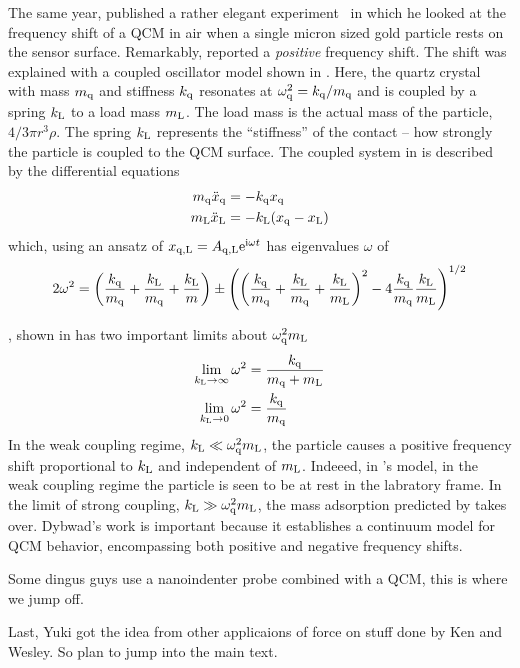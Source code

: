 The same year,  published a rather elegant
experiment~\cite{dybwad} in which he looked at the frequency shift of a QCM
in air when a single micron sized gold particle rests on the sensor
surface.  Remarkably,  reported a \textit{positive}
frequency shift.  The shift was explained with a coupled oscillator model
shown in .
Here, the quartz crystal with mass $m_\mathrm{q}$ and stiffness
$k_\mathrm{q}$ resonates at
$\omega_\mathrm{q}^2=k_\mathrm{q}/m_\mathrm{q}$ and is coupled by a spring
$k_\mathrm{L}$ to a load mass $m_\mathrm{L}$.  The load mass is the actual mass of
the particle, $4/3 \pi r^3 \rho$.  The spring $k_\mathrm{L}$ represents the
``stiffness'' of the contact -- how strongly the particle is coupled to the
QCM surface.  The coupled system in  is described
by the differential equations
\begin{align}
 m_\mathrm{q} \ddot{x}_\mathrm{q} &= -k_\mathrm{q} x_\mathrm{q}\\
 m_\mathrm{L} \ddot{x}_\mathrm{L} &= -k_\mathrm{L} (x_\mathrm{q}-x_\mathrm{L})
\end{align}
which, using an ansatz of
$x_{\mathrm{q},\mathrm{L}}=A_{\mathrm{q},\mathrm{L}}{\mathrm{e}}^{{\mathrm{i}} \omega t}$ has
eigenvalues $\omega$ of
\begin{equation}
 2\omega^{2}=\left(\frac{k_\mathrm{q}}{m_\mathrm{q}}+\frac{k_\mathrm{L}}{m_\mathrm{q}}+\frac{k_\mathrm{L}}{m}\right)\pm\left(\left(\frac{k_\mathrm{q}}{m_\mathrm{q}}+\frac{k_\mathrm{L}}{m_\mathrm{q}}+\frac{k_\mathrm{L}}{m_\mathrm{L}}\right)^{2}-4\frac{k_\mathrm{q}}{m_\mathrm{q}}\frac{k_\mathrm{L}}{m_\mathrm{L}}\right)^{1/2}
 \label{eqn:dybwadresult}
\end{equation}

, shown in  has two
important limits about $\omega_\mathrm{q}^2 m_\mathrm{L}$
\begin{align}
 \lim_{k_\mathrm{L}\to\infty} \omega^2 &= \frac{k_\mathrm{q}}{m_\mathrm{q}+m_\mathrm{L}}\\
 \lim_{k_\mathrm{L}\to0} \omega^2 &= \frac{k_\mathrm{q}}{m_\mathrm{q}}
\end{align}
In the weak coupling regime, $k_\mathrm{L}\ll\omega_\mathrm{q}^2m_\mathrm{L}$, the particle causes a
positive frequency shift proportional to $k_\mathrm{L}$ and independent of $m_\mathrm{L}$.
Indeeed, in 's model, in the weak coupling regime the
particle is seen to be at rest in the labratory frame. In the limit of strong
coupling, $k_\mathrm{L}\gg\omega_\mathrm{q}^2m_\mathrm{L}$, the mass adsorption predicted by
 takes over.  Dybwad's work is important because it
establishes a continuum model for QCM behavior, encompassing both positive
and negative frequency shifts.

Some dingus guys use a nanoindenter probe combined with a QCM, this is
where we jump off.

Last, Yuki got the idea from other applicaions of force on stuff done by
Ken and Wesley.  So plan to jump into the main text.

